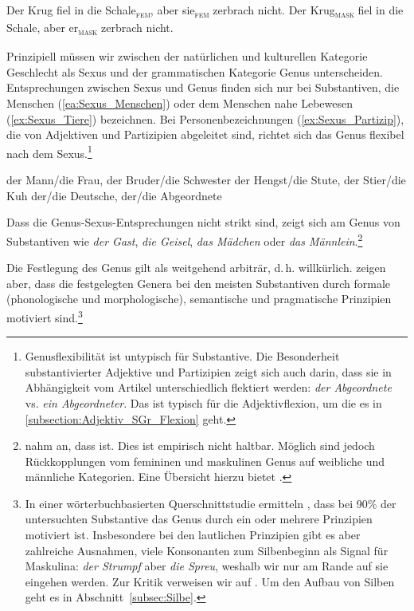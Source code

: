 \ea \label{ea:Genusbezug}
\ea \label{ea:Krug_Schale_sie} Der Krug fiel in die Schale\textsubscript{\textsc{fem}}, aber sie\textsubscript{\textsc{fem}} zerbrach nicht.
\ex \label{ex:Krug_Schale_er} Der Krug\textsubscript{\textsc{mask}} fiel in die Schale, aber er\textsubscript{\textsc{mask}} zerbrach nicht.
\z 
\z 

Prinzipiell müssen wir zwischen der natürlichen und kulturellen Kategorie Geschlecht als Sexus und der grammatischen Kategorie Genus unterscheiden. Entsprechungen zwischen Sexus und Genus finden sich nur bei Substantiven, die Menschen (\ref{ea:Sexus_Menschen}) oder dem Menschen nahe Lebewesen (\ref{ex:Sexus_Tiere}) bezeichnen. Bei Personenbezeichnungen (\ref{ex:Sexus_Partizip}), die von Adjektiven und Partizipien abgeleitet sind, richtet sich das Genus flexibel nach dem Sexus.\footnote{Genusflexibilität ist untypisch für Substantive. Die Besonderheit substantivierter Adjektive und Partizipien zeigt sich auch darin, dass sie in Abhängigkeit vom Artikel unterschiedlich flektiert werden: \textit{der Abgeordnete} vs. \textit{ein Abgeordneter}. Das ist typisch für die Adjektivflexion, um die es in \ref{subsection:Adjektiv_SGr_Flexion} geht.}

\ea \label{ea:Sexus_Genus}
\ea \label{ea:Sexus_Menschen} der Mann/die Frau, der Bruder/die Schwester
\ex \label{ex:Sexus_Tiere} der Hengst/die Stute, der Stier/die Kuh
\ex \label{ex:Sexus_Partizip} der/die Deutsche, der/die Abgeordnete
\z 
\z 

Dass die Genus-Sexus-Entsprechungen nicht strikt sind, zeigt sich am Genus von Substantiven wie \textit{der Gast}, \textit{die Geisel}, \textit{das Mädchen} oder \textit{das Männlein}.\footnote{\citet[346]{Grimm1831_3} nahm an, dass  ist. Dies ist empirisch nicht haltbar. Möglich sind jedoch Rückkopplungen vom femininen und maskulinen Genus auf weibliche und männliche Kategorien. Eine Übersicht hierzu bietet \citet{Baer2004}.}

Die Festlegung des Genus gilt als weitgehend arbiträr, d.\,h. willkürlich. \citet{Koepcke_Zubin1996} zeigen aber, dass die festgelegten Genera bei den meisten Substantiven durch formale (phonologische und morphologische), semantische und pragmatische Prinzipien motiviert sind.\footnote{In einer wörterbuchbasierten Querschnittstudie ermitteln \citet[487]{Koepcke_Zubin1996}, dass bei 90\% der untersuchten Substantive das Genus durch ein oder mehrere Prinzipien motiviert ist. Insbesondere bei den lautlichen Prinzipien gibt es aber zahlreiche Ausnahmen, \zB viele Konsonanten zum Silbenbeginn als Signal für Maskulina: \textit{der Strumpf} aber \textit{die Spreu}, weshalb wir nur am Rande auf sie eingehen werden. Zur Kritik verweisen wir auf \citet[77--78]{Wegener1995}. Um den Aufbau von Silben geht es in Abschnitt~\ref{subsec:Silbe}.}


